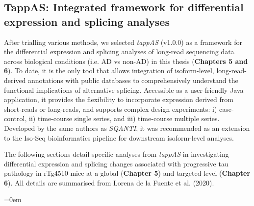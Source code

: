 \subsection{TappAS: Integrated framework for differential expression and splicing analyses}\label{ch3_tappas_explained}
After trialling various methods, we selected \textit{tappAS}\cite{DeLaFuente2020} (v1.0.0) as a framework for the differential expression and splicing analyses of long-read sequencing data across biological conditions (i.e. AD vs non-AD) in this thesis (\textbf{Chapters 5 and 6}). To date, it is the only tool that allows integration of isoform-level, long-read-derived annotations with public databases to comprehensively understand the functional implications of alternative splicing. Accessible as a user-friendly Java application, it provides the flexibility to incorporate expression derived from short-reads or long-reads, and supports complex design experiments: i) case-control, ii) time-course single series, and iii) time-course multiple series. Developed by the same authors as \textit{SQANTI}\cite{Tardaguila2018}, it was recommended as an extension to the Iso-Seq bioinformatics pipeline for downstream isoform-level analyses.    

The following sections detail specific analyses from \textit{tappAS} in investigating differential expression and splicing changes associated with progressive tau pathology in rTg4510 mice at a global (\textbf{Chapter 5}) and targeted level (\textbf{Chapter 6}). All details are summarised from Lorena de la Fuente et al. (2020)\cite{DeLaFuente2020}.

\vspace{2cm}
\begingroup
\parindent=0em
\localtableofcontents 
\endgroup


